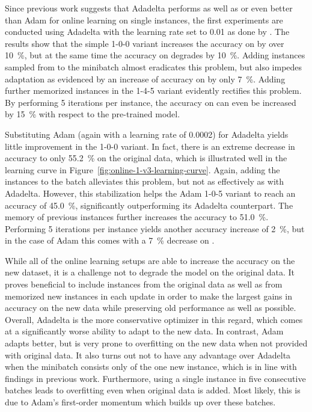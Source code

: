 Since previous work suggests that Adadelta performs as well as
\parencite{peris-2017} or even better than \parencites{turchi-2017}{peris-2019}
Adam for online learning on single instances, the first experiments are
conducted using Adadelta with the learning rate set to \num{0.01} as done by
\textcite{peris-2019}. The results show that the simple 1-0-0 variant increases
the accuracy on \nlmfour{} by over \SI{10}{\%}, but at the same time the
accuracy on \nlmthree{} degrades by \SI{10}{\%}. Adding instances sampled from
\nlmthree{} to the minibatch almost eradicates this problem, but also impedes
adaptation as evidenced by an increase of accuracy on \nlmfour{} by only
\SI{7}{\%}. Adding further memorized \nlmfour{} instances in the 1-4-5 variant
evidently rectifies this problem. By performing 5 iterations per instance, the
accuracy on \nlmfour{} can even be increased by \SI{15}{\%} with respect to the
pre-trained model.

Substituting Adam (again with a learning rate of \num{0.0002}) for Adadelta
yields little improvement in the 1-0-0 variant. In fact, there is an extreme
decrease in accuracy to only \SI{55.2}{\%} on the original \nlmthree{} data,
which is illustrated well in the learning curve in
Figure~\ref{fig:online-1-v3-learning-curve}. Again, adding the \nlmthree{}
instances to the batch alleviates this problem, but not as effectively as with
Adadelta. However, this stabilization helps the Adam 1-0-5 variant to reach an
\nlmfour{} accuracy of \SI{45.0}{\%}, significantly outperforming its Adadelta
counterpart. The memory of previous \nlmfour{} instances further increases the
accuracy to \SI{51.0}{\%}. Performing 5 iterations per instance yields
another accuracy increase of \SI{2}{\%}, but in the case of Adam this comes with
a \SI{7}{\%} decrease on \nlmthree{}.

While all of the online learning setups are able to increase the accuracy on the
new \nlmapsfour{} dataset, it is a challenge not to degrade the model on the
original data. It proves beneficial to include instances from the original data
as well as from memorized new instances in each update in order to make the
largest gains in accuracy on the new data while preserving old performance as
well as possible. Overall, Adadelta is the more conservative optimizer in this
regard, which comes at a significantly worse ability to adapt to the new data.
In contrast, Adam adapts better, but is very prone to overfitting on the new
data when not provided with original data. It also turns out not to have any
advantage over Adadelta when the minibatch consists only of the one new
instance, which is in line with findings in previous work. Furthermore, using a
single instance in five consecutive batches leads to overfitting even when
original data is added. Most likely, this is due to Adam’s first-order momentum
which builds up over these batches.

